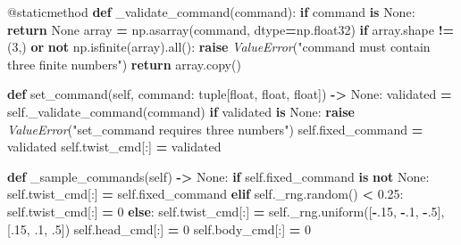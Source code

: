 \documentclass[
  american,
  11pt,
  letterpaper,
]{article}
\newenvironment{Shaded}{\begin{snugshade}}{\end{snugshade}}
\newcommand{\AttributeTok}[1]{\textcolor[rgb]{0.13,0.29,0.53}{#1}}
\newcommand{\BuiltInTok}[1]{#1}
\newcommand{\ControlFlowTok}[1]{\textcolor[rgb]{0.13,0.29,0.53}{\textbf{#1}}}
\newcommand{\DecValTok}[1]{\textcolor[rgb]{0.00,0.00,0.81}{#1}}
\newcommand{\FloatTok}[1]{\textcolor[rgb]{0.00,0.00,0.81}{#1}}
\newcommand{\KeywordTok}[1]{\textcolor[rgb]{0.13,0.29,0.53}{\textbf{#1}}}
\newcommand{\NormalTok}[1]{#1}
\newcommand{\OperatorTok}[1]{\textcolor[rgb]{0.81,0.36,0.00}{\textbf{#1}}}
\newcommand{\PreprocessorTok}[1]{\textcolor[rgb]{0.56,0.35,0.01}{\textit{#1}}}
\newcommand{\StringTok}[1]{\textcolor[rgb]{0.31,0.60,0.02}{#1}}
\newcommand{\VariableTok}[1]{\textcolor[rgb]{0.00,0.00,0.00}{#1}}
\renewenvironment{Shaded}{\par\smallskip}{\par\smallskip}
\begin{document}
\begin{Shaded}
\begin{Highlighting}[]
    \AttributeTok{@staticmethod}
    \KeywordTok{def}\NormalTok{ \_validate\_command(command):}
        \ControlFlowTok{if}\NormalTok{ command }\KeywordTok{is} \VariableTok{None}\NormalTok{:}
            \ControlFlowTok{return} \VariableTok{None}
\NormalTok{        array }\OperatorTok{=}\NormalTok{ np.asarray(command, dtype}\OperatorTok{=}\NormalTok{np.float32)}
        \ControlFlowTok{if}\NormalTok{ array.shape }\OperatorTok{!=}\NormalTok{ (}\DecValTok{3}\NormalTok{,) }\KeywordTok{or} \KeywordTok{not}\NormalTok{ np.isfinite(array).}\BuiltInTok{all}\NormalTok{():}
            \ControlFlowTok{raise} \PreprocessorTok{ValueError}\NormalTok{(}\StringTok{"command must contain three finite numbers"}\NormalTok{)}
        \ControlFlowTok{return}\NormalTok{ array.copy()}

    \KeywordTok{def}\NormalTok{ set\_command(}\VariableTok{self}\NormalTok{, command: }\BuiltInTok{tuple}\NormalTok{[}\BuiltInTok{float}\NormalTok{, }\BuiltInTok{float}\NormalTok{, }\BuiltInTok{float}\NormalTok{]) }\OperatorTok{{-}\textgreater{}} \VariableTok{None}\NormalTok{:}
\NormalTok{        validated }\OperatorTok{=} \VariableTok{self}\NormalTok{.\_validate\_command(command)}
        \ControlFlowTok{if}\NormalTok{ validated }\KeywordTok{is} \VariableTok{None}\NormalTok{:}
            \ControlFlowTok{raise} \PreprocessorTok{ValueError}\NormalTok{(}\StringTok{"set\_command requires three numbers"}\NormalTok{)}
        \VariableTok{self}\NormalTok{.fixed\_command }\OperatorTok{=}\NormalTok{ validated}
        \VariableTok{self}\NormalTok{.twist\_cmd[:] }\OperatorTok{=}\NormalTok{ validated}

    \KeywordTok{def}\NormalTok{ \_sample\_commands(}\VariableTok{self}\NormalTok{) }\OperatorTok{{-}\textgreater{}} \VariableTok{None}\NormalTok{:}
        \ControlFlowTok{if} \VariableTok{self}\NormalTok{.fixed\_command }\KeywordTok{is} \KeywordTok{not} \VariableTok{None}\NormalTok{:}
            \VariableTok{self}\NormalTok{.twist\_cmd[:] }\OperatorTok{=} \VariableTok{self}\NormalTok{.fixed\_command}
        \ControlFlowTok{elif} \VariableTok{self}\NormalTok{.\_rng.random() }\OperatorTok{\textless{}} \FloatTok{0.25}\NormalTok{:}
            \VariableTok{self}\NormalTok{.twist\_cmd[:] }\OperatorTok{=} \DecValTok{0}
        \ControlFlowTok{else}\NormalTok{:}
            \VariableTok{self}\NormalTok{.twist\_cmd[:] }\OperatorTok{=} \VariableTok{self}\NormalTok{.\_rng.uniform([}\OperatorTok{{-}}\FloatTok{.15}\NormalTok{, }\OperatorTok{{-}}\FloatTok{.1}\NormalTok{, }\OperatorTok{{-}}\FloatTok{.5}\NormalTok{], [}\FloatTok{.15}\NormalTok{, }\FloatTok{.1}\NormalTok{, }\FloatTok{.5}\NormalTok{])}
        \VariableTok{self}\NormalTok{.head\_cmd[:] }\OperatorTok{=} \DecValTok{0}
        \VariableTok{self}\NormalTok{.body\_cmd[:] }\OperatorTok{=} \DecValTok{0}


\end{Highlighting}
\end{Shaded}
\end{document}
